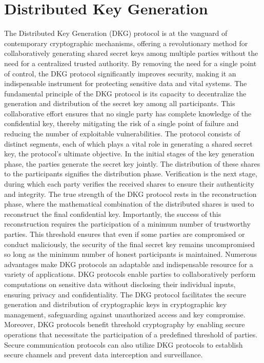 \documentclass[../Main.tex]{subfiles}
\begin{document}
\section{Distributed Key Generation}
The Distributed Key Generation (DKG) protocol is at the vanguard of contemporary cryptographic mechanisms, offering a revolutionary method for collaboratively generating shared secret keys among multiple parties without the need for a centralized trusted authority. By removing the need for a single point of control, the DKG protocol significantly improves security, making it an indispensable instrument for protecting sensitive data and vital systems. The fundamental principle of the DKG protocol is its capacity to decentralize the generation and distribution of the secret key among all participants. This collaborative effort ensures that no single party has complete knowledge of the confidential key, thereby mitigating the risk of a single point of failure and reducing the number of exploitable vulnerabilities. The protocol consists of distinct segments, each of which plays a vital role in generating a shared secret key, the protocol's ultimate objective. In the initial stages of the key generation phase, the parties generate the secret key jointly. The distribution of these shares to the participants signifies the distribution phase. Verification is the next stage, during which each party verifies the received shares to ensure their authenticity and integrity. The true strength of the DKG protocol rests in the reconstruction phase, where the mathematical combination of the distributed shares is used to reconstruct the final confidential key. Importantly, the success of this reconstruction requires the participation of a minimum number of trustworthy parties. This threshold ensures that even if some parties are compromised or conduct maliciously, the security of the final secret key remains uncompromised so long as the minimum number of honest participants is maintained. Numerous advantages make DKG protocols an adaptable and indispensable resource for a variety of applications. DKG protocols enable parties to collaboratively perform computations on sensitive data without disclosing their individual inputs, ensuring privacy and confidentiality. The DKG protocol facilitates the secure generation and distribution of cryptographic keys in cryptographic key management, safeguarding against unauthorized access and key compromise. Moreover, DKG protocols benefit threshold cryptography by enabling secure operations that necessitate the participation of a predefined threshold of parties. Secure communication protocols can also utilize DKG protocols to establish secure channels and prevent data interception and surveillance.
\end{document}
